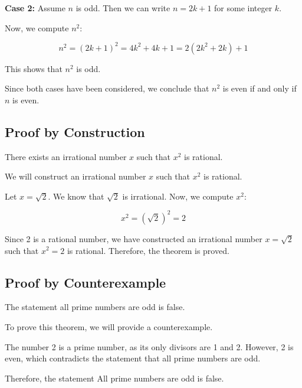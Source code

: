 \textbf{Case 2:} Assume \(n\) is odd. Then we can write \( n = 2k + 1 \) for some integer \(k\).
\vspace{\baselineskip}

Now, we compute \( n^2 \):

\[
	n^2 = {(2k + 1)}^2 = 4k^2 + 4k + 1 = 2(2k^2 + 2k) + 1
\]

This shows that \( n^2 \) is odd.
\vspace{\baselineskip}

Since both cases have been considered, we conclude that \( n^2 \) is even if and only if \(n\) is even.

\QED

\subsection{Proof by Construction}

There exists an irrational number \(x\) such that \( x^2 \) is rational.
\vspace{\baselineskip}

We will construct an irrational number \(x\) such that \( x^2 \) is rational.
\vspace{\baselineskip}

Let \( x = \sqrt{2} \). We know that \( \sqrt{2} \) is irrational. Now, we compute \( x^2 \):
	
\[
	x^2 = (\sqrt{2})^2 = 2
\]
	
Since 2 is a rational number, we have constructed an irrational number \( x = \sqrt{2} \) such 
that \( x^2 = 2 \) is rational. Therefore, the theorem is proved.

\QED

\subsection{Proof by Counterexample}

The statement all prime numbers are odd is false.
\vspace{\baselineskip}

To prove this theorem, we will provide a counterexample.
\vspace{\baselineskip}

The number 2 is a prime number, as its only divisors are 1 and 2. However, 2 is 
even, which contradicts the statement that all prime numbers are odd.
\vspace{\baselineskip}

Therefore, the statement All prime numbers are odd is false.
\QED

